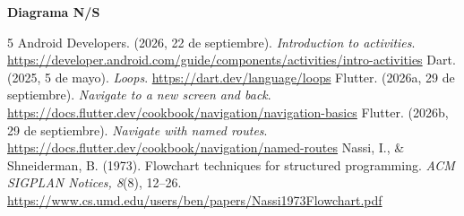 \documentclass[12pt,letterpaper]{article}
\begin{document}
\begin{singlespace}
\begin{minipage}[t]{.54\linewidth}
\end{minipage}
\par\vspace{1cm}
\noindent\textbf{Diagrama N/S}
\begin{center}
\end{center}
\end{singlespace}


\clearpage
\begin{thebibliography}{5}
Android Developers. (2026, 22 de septiembre). \textit{Introduction to activities}. \url{https://developer.android.com/guide/components/activities/intro-activities}
Dart. (2025, 5 de mayo). \textit{Loops}. \url{https://dart.dev/language/loops}
Flutter. (2026a, 29 de septiembre). \textit{Navigate to a new screen and back}. \url{https://docs.flutter.dev/cookbook/navigation/navigation-basics}
Flutter. (2026b, 29 de septiembre). \textit{Navigate with named routes}. \url{https://docs.flutter.dev/cookbook/navigation/named-routes}
Nassi, I., \& Shneiderman, B. (1973). Flowchart techniques for structured programming. \textit{ACM SIGPLAN Notices, 8}(8), 12--26. \url{https://www.cs.umd.edu/users/ben/papers/Nassi1973Flowchart.pdf}
\end{thebibliography}
\end{document}
